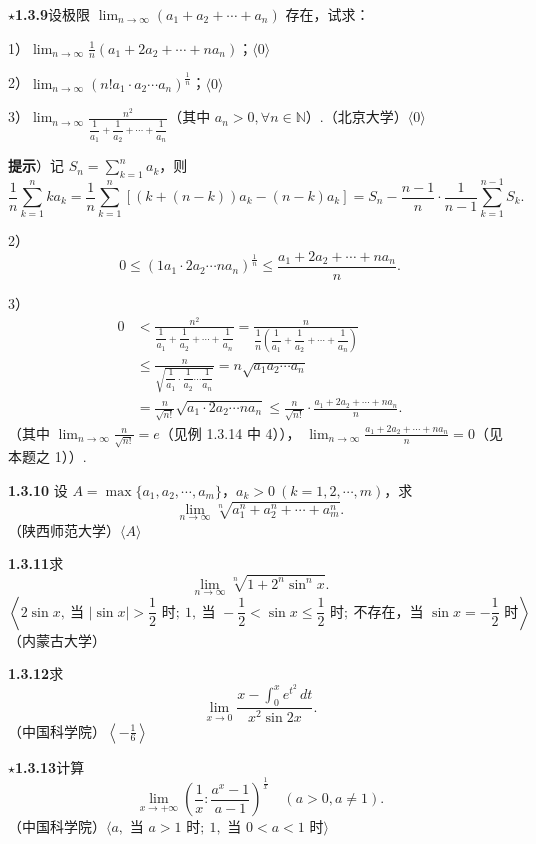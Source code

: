 \documentclass[UTF8,12pt,a4paper,fontset=fandol]{ctexart}
\begin{document}
\noindent\textbf{$\star$1.3.9}\quad 设极限 $\displaystyle\lim_{n\to\infty}(a_1+a_2+\cdots+a_n)$ 存在，试求：

1）$\displaystyle\lim_{n\to\infty}\frac1n(a_1+2a_2+\cdots+na_n)$；\quad $\langle0\rangle$

2）$\displaystyle\lim_{n\to\infty}(n!a_1\cdot a_2\cdots a_n)^{\frac1n}$；\quad $\langle0\rangle$

3）$\displaystyle\lim_{n\to\infty}\frac{n^2}{\dfrac1{a_1}+\dfrac1{a_2}+\cdots+\dfrac1{a_n}}$（其中 $a_n>0,\forall n\in\mathbb N$）.（北京大学）\quad $\langle0\rangle$

\noindent\textbf{提示}）记 $S_n=\sum_{k=1}^n a_k$，则
\[
  \frac1n\sum_{k=1}^nka_k
  =\frac1n\sum_{k=1}^n[(k+(n-k))a_k-(n-k)a_k]
  =S_n-\frac{n-1}{n}\cdot\frac1{n-1}\sum_{k=1}^{n-1}S_k.
\]

2）
\[
  0\le(1a_1\cdot2a_2\cdots na_n)^{\frac1n}
  \le\frac{a_1+2a_2+\cdots+na_n}{n}.
\]

3）
\[
\begin{aligned}
0&<\frac{n^2}{\dfrac1{a_1}+\dfrac1{a_2}+\cdots+\dfrac1{a_n}}
=\frac n{\dfrac1n\left(\dfrac1{a_1}+\dfrac1{a_2}+\cdots+\dfrac1{a_n}\right)}\\
&\le
\frac n{\sqrt{\dfrac1{a_1}\cdot\dfrac1{a_2}\cdots\dfrac1{a_n}}}
=n\sqrt{a_1a_2\cdots a_n}\\
&=\frac n{\sqrt{n!}}\sqrt{a_1\cdot2a_2\cdots na_n}
\le\frac n{\sqrt{n!}}\cdot
\frac{a_1+2a_2+\cdots+na_n}{n}.
\end{aligned}
\]
（其中 $\displaystyle\lim_{n\to\infty}\frac n{\sqrt{n!}}=e$（见例 1.3.14 中 4）），
$\displaystyle\lim_{n\to\infty}\frac{a_1+2a_2+\cdots+na_n}{n}=0$（见本题之 1））.

\noindent\textbf{1.3.10}\quad
设 $A=\max\{a_1,a_2,\cdots,a_m\}$，$a_k>0\ (k=1,2,\cdots,m)$，求
\[
  \lim_{n\to\infty}\sqrt[n]{a_1^n+a_2^n+\cdots+a_m^n}.
\]
（陕西师范大学）\quad $\langle A\rangle$

\noindent\textbf{1.3.11}\quad 求
\[
  \lim_{n\to\infty}\sqrt[n]{1+2^n\sin^nx}.
\]
\[
  \left\langle
  2\sin x,\ \text{当 }|\sin x|>\frac12\text{ 时};\ 
  1,\ \text{当 }-\frac12<\sin x\le\frac12\text{ 时};\
  \text{不存在，当 }\sin x=-\frac12\text{ 时}
  \right\rangle
\]
（内蒙古大学）

\noindent\textbf{1.3.12}\quad 求
\[
  \lim_{x\to0}\frac{x-\int_0^xe^{t^2}\,dt}{x^2\sin2x}.
\]
（中国科学院）\quad $\left\langle-\frac16\right\rangle$

\noindent\textbf{$\star$1.3.13}\quad 计算
\[
  \lim_{x\to+\infty}\left(\frac1x:\frac{a^x-1}{a-1}\right)^{\frac1x}
  \quad(a>0,a\ne1).
\]
（中国科学院）\quad $\langle a,\text{ 当 }a>1\text{ 时};\ 1,\text{ 当 }0<a<1\text{ 时}\rangle$
\end{document}
